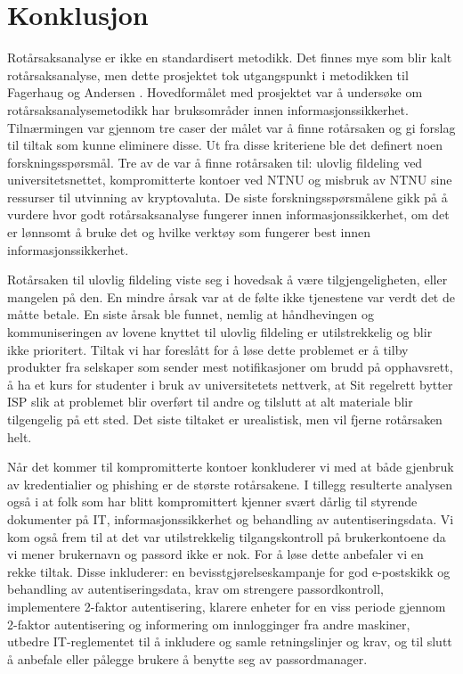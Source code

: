\chapter{Konklusjon}
\label{kap:konklusjon}
Rotårsaksanalyse er ikke en standardisert metodikk. Det finnes mye som blir kalt rotårsaksanalyse, men dette prosjektet tok utgangspunkt i metodikken til Fagerhaug og Andersen \cite{RCA}. Hovedformålet med prosjektet var å undersøke om rotårsaksanalysemetodikk har bruksområder innen informasjonssikkerhet. Tilnærmingen var gjennom tre caser der målet var å finne rotårsaken og gi forslag til tiltak som kunne eliminere disse. Ut fra disse kriteriene ble det definert noen forskningsspørsmål. Tre av de var å finne rotårsaken til: ulovlig fildeling ved universitetsnettet, kompromitterte kontoer ved NTNU og misbruk av NTNU sine ressurser til utvinning av kryptovaluta. De siste forskningsspørsmålene gikk på å vurdere hvor godt rotårsaksanalyse fungerer innen informasjonssikkerhet, om det er lønnsomt å bruke det og hvilke verktøy som fungerer best innen informasjonssikkerhet. 
\newline

\noindent Rotårsaken til ulovlig fildeling viste seg i hovedsak å være tilgjengeligheten, eller mangelen på den. En mindre årsak var at de følte ikke tjenestene var verdt det de måtte betale. En siste årsak ble funnet, nemlig at håndhevingen og kommuniseringen av lovene knyttet til ulovlig fildeling er utilstrekkelig og blir ikke prioritert. Tiltak vi har foreslått for å løse dette problemet er å tilby produkter fra selskaper som sender mest notifikasjoner om brudd på opphavsrett, å ha et kurs for studenter i bruk av universitetets nettverk, at Sit regelrett bytter ISP slik at problemet blir overført til andre og tilslutt at alt materiale blir tilgengelig på ett sted. Det siste tiltaket er urealistisk, men vil fjerne rotårsaken helt. 
\newline

\noindent Når det kommer til kompromitterte kontoer konkluderer vi med at både gjenbruk av kredentialier og phishing er de største rotårsakene. I tillegg resulterte analysen også i at folk som har blitt kompromittert kjenner svært dårlig til styrende dokumenter på IT, informasjonssikkerhet og behandling av autentiseringsdata. Vi kom også frem til at det var utilstrekkelig tilgangskontroll på brukerkontoene da vi mener brukernavn og passord ikke er nok. For å løse dette anbefaler vi en rekke tiltak. Disse inkluderer: en bevisstgjørelseskampanje for god e-postskikk og behandling av autentiseringsdata, krav om strengere passordkontroll, implementere 2-faktor autentisering, klarere enheter for en viss periode gjennom 2-faktor autentisering og informering om innlogginger fra andre maskiner, utbedre IT-reglementet til å inkludere og samle retningslinjer og krav, og til slutt å anbefale eller pålegge brukere å benytte seg av passordmanager. 
\newline

